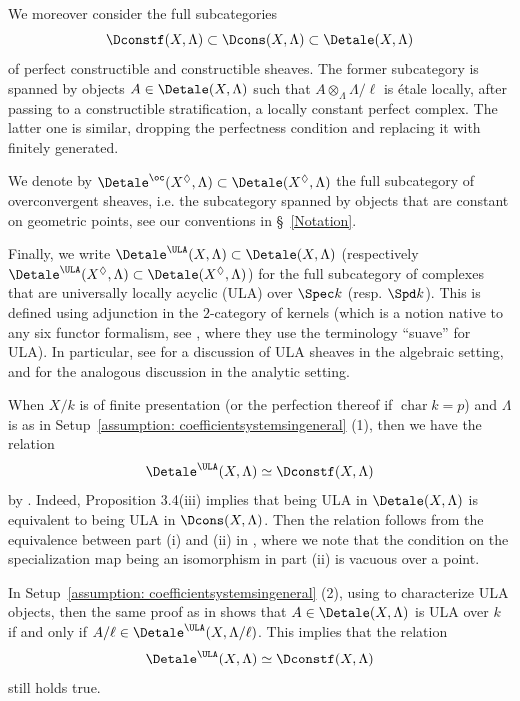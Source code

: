 \documentclass[letterpaper,11pt]{amsart}
\begin{document}
We moreover consider the full subcategories 
\[\Dconstf(X,\Lambda)\subset \Dcons(X,\Lambda) \subset \Detale(X,\Lambda)\]
of perfect constructible and constructible sheaves. The former subcategory is spanned by objects $A\in \Detale(X,\Lambda)$ such that $A\otimes_{\Lambda} \Lambda/\ell$ is \'etale locally, after passing to a constructible stratification, a locally constant perfect complex. The latter one is similar, dropping the perfectness condition and replacing it with finitely generated.

We denote by $\Detale^{\oc}(X^{\Diamond},\Lambda)\subset \Detale(X^{\Diamond},\Lambda)$ the full subcategory of overconvergent sheaves, i.e. the subcategory spanned by objects that are constant on geometric points, see our conventions in \S~\ref{Notation}.

Finally, we write $\Detale^{\ULA}(X,\Lambda) \subset \Detale(X,\Lambda)$ (respectively $\Detale^{\ULA}(X^{\Diamond},\Lambda) \subset \Detale(X^\Diamond,\Lambda)$) for the full subcategory of complexes that are universally locally acyclic (ULA) over $\Spec k$ (resp. $\Spd k$). This is defined using adjunction in the $2$-category of kernels (which is a notion native to any six functor formalism, see \cite[Section~4]{HeyerMann}, where they use the terminology ``suave'' for ULA).  In particular, see \cite[Section~3]{HansenScholzeRelativePerversity} for a discussion of ULA sheaves in the algebraic setting, and \cite[Section~IV.2]{FSGeomLLC} for the analogous discussion in the analytic setting. 
\begin{remark}{\label{rem: PerfectConstructibleSameasULA}}
When $X/k$ is of finite presentation (or the perfection thereof if $\operatorname{char}k=p$) and $\Lambda$ is as in Setup~\ref{assumption: coefficientsystemsingeneral} (1), then we have the relation
\[\Detale^{\ULA}(X,\Lambda) \simeq \Dconstf(X,\Lambda)\]
by \cite[Proposition 3.4(iii), Theorem 4.4]{HansenScholzeRelativePerversity}. Indeed, Proposition 3.4(iii) implies that being ULA in $\Detale(X,\Lambda)$ is equivalent to being ULA in $\Dcons(X,\Lambda)$. Then the relation follows from the equivalence between part (i) and (ii) in \cite[Theorem~4.4]{HansenScholzeRelativePerversity}, where we note that the condition on the specialization map being an isomorphism in part (ii) is vacuous over a point. 

In Setup~\ref{assumption: coefficientsystemsingeneral} (2), using \cite[Lemma 4.4.5]{HeyerMann} to characterize ULA objects, then the same proof as in \cite[Proposition 7.14]{Mann2022NuclearSheaves} shows that $A\in \Detale(X,\Lambda)$ is ULA over $k$ if and only if $A/\ell \in \Detale^{\ULA}(X,\Lambda/\ell)$. This implies that the relation
\[\Detale^{\ULA}(X,\Lambda) \simeq \Dconstf(X,\Lambda)\]
still holds true.
\end{remark}
\end{document}
